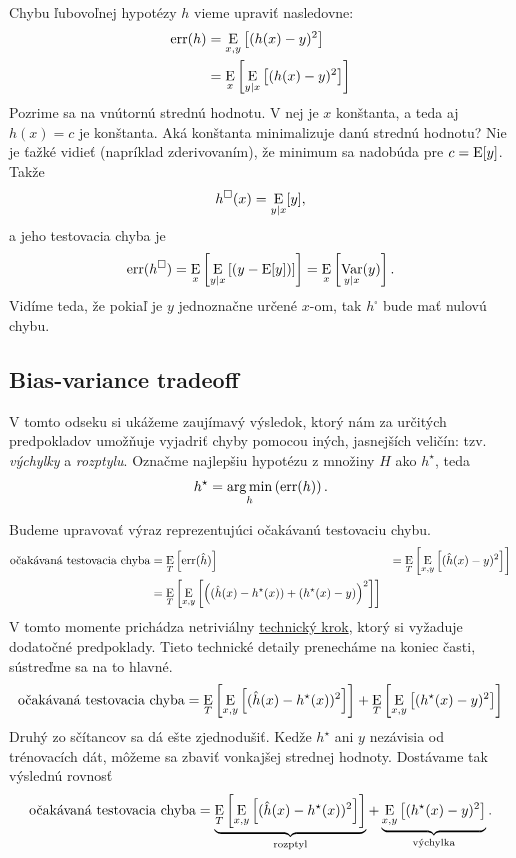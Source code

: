 Chybu ľubovoľnej hypotézy $h$ vieme upraviť nasledovne:
\begin{align}
  \err(h)
    &= \E_{x,y} \left[ (h(x) - y)^2 \right] \\
    &= \E_{x} \left[ \E_{y|x} \left[ (h(x) - y)^2 \right] \right]
\end{align}
Pozrime sa na vnútornú strednú hodnotu. V nej je $x$ konštanta, a
teda aj $h(x) = c$ je konštanta. Aká konštanta minimalizuje danú
strednú hodnotu? Nie je ťažké vidieť (napríklad zderivovaním), že
minimum sa nadobúda pre $c = \E[y]$. Takže
$$h^{\square}(x) = \E_{y|x}[y],$$
a jeho testovacia chyba je
$$\err(h^{\square}) = \E_{x} \left[ \E_{y|x} \left[ (y - \E[y]) \right] \right] = \E_{x} \left[ \Var_{y|x}(y) \right].$$
Vidíme teda, že pokiaľ je $y$ jednoznačne určené $x$-om, tak
$h^{\square}$ bude mať nulovú chybu.



\subsection{Bias-variance tradeoff}
V tomto odseku si ukážeme zaujímavý výsledok, ktorý nám za určitých
predpokladov umožňuje vyjadriť chyby pomocou iných, jasnejších veličín:
tzv. \emph{výchylky} a \emph{rozptylu}.
Označme najlepšiu hypotézu z množiny $H$ ako $h^\star$, teda
$$h^\star = \argmin_h \left( \err(h) \right).$$

Budeme upravovať výraz reprezentujúci očakávanú testovaciu chybu.
\begin{align}
  \chalg
    &= \E_T \left[ \err(\hat{h}) \right]
    &= \E_T \left[ \E_{x,y} \left[ (\hat{h}(x) - y)^2 \right] \right] \\
    &= \E_T \left[ \E_{x,y} \left[ \left( (\hat{h}(x) - h^\star(x)) + (h^\star(x) - y) \right)^2 \right] \right]
\end{align}
V tomto momente prichádza netriviálny \hyperref[tradeoff:tech]{technický krok},
ktorý si vyžaduje dodatočné predpoklady. Tieto technické detaily prenecháme
na koniec časti, sústreďme sa na to hlavné.
$$
  \chalg
    = \E_T \left[ \E_{x,y} \left[ (\hat{h}(x) - h^\star(x))^2 \right] \right]
    + \E_T \left[ \E_{x,y} \left[ (h^\star(x) - y)^2 \right] \right]
$$
Druhý zo sčítancov sa dá ešte zjednodušiť. Kedže $h^\star$ ani $y$
nezávisia od trénovacích dát, môžeme sa zbaviť vonkajšej strednej
hodnoty. Dostávame tak výslednú rovnosť
\begin{equation}
  \chalg
    = \underbrace{\E_T \left[ \E_{x,y} \left[ (\hat{h}(x) - h^\star(x))^2 \right] \right]}_{\text{rozptyl}}
    + \underbrace{\E_{x,y} \left[ (h^\star(x) - y)^2 \right]}_{\text{výchylka}}.
\label{biasvarianceodvodenie}
\end{equation}

